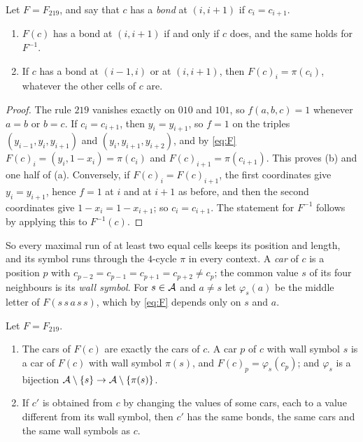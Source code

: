\begin{lemma}\label{hw:bonds}
Let $F=F_{219}$, and say that $c$ has a \emph{bond} at $(i,i+1)$ if $c_i=c_{i+1}$.
\begin{enumerate}
\item[(a)] $F(c)$ has a bond at $(i,i+1)$ if and only if $c$ does, and the same holds for $F^{-1}$.
\item[(b)] If $c$ has a bond at $(i-1,i)$ or at $(i,i+1)$, then $F(c)_i=\pi(c_i)$, whatever the other cells of $c$ are.
\end{enumerate}
\end{lemma}

\begin{proof}
The rule $219$ vanishes exactly on $010$ and $101$, so $f(a,b,c)=1$ whenever $a=b$ or $b=c$. If $c_i=c_{i+1}$, then $y_i=y_{i+1}$, so $f=1$ on the triples $(y_{i-1},y_i,y_{i+1})$ and $(y_i,y_{i+1},y_{i+2})$, and by \eqref{eq:F} $F(c)_i=(y_i,1-x_i)=\pi(c_i)$ and $F(c)_{i+1}=\pi(c_{i+1})$. This proves (b) and one half of (a). Conversely, if $F(c)_i=F(c)_{i+1}$, the first coordinates give $y_i=y_{i+1}$, hence $f=1$ at $i$ and at $i+1$ as before, and then the second coordinates give $1-x_i=1-x_{i+1}$; so $c_i=c_{i+1}$. The statement for $F^{-1}$ follows by applying this to $F^{-1}(c)$.
\end{proof}

So every maximal run of at least two equal cells keeps its position and length, and its symbol runs through the $4$-cycle $\pi$ in every context. A \emph{car} of $c$ is a position $p$ with $c_{p-2}=c_{p-1}=c_{p+1}=c_{p+2}\ne c_p$; the common value $s$ of its four neighbours is its \emph{wall symbol}. For $s\in\mathcal{A}$ and $a\ne s$ let $\varphi_s(a)$ be the middle letter of $F(s\,s\,a\,s\,s)$, which by \eqref{eq:F} depends only on $s$ and $a$.

\begin{lemma}\label{hw:cars219}
Let $F=F_{219}$.
\begin{enumerate}
\item[(a)] The cars of $F(c)$ are exactly the cars of $c$. A car $p$ of $c$ with wall symbol $s$ is a car of $F(c)$ with wall symbol $\pi(s)$, and $F(c)_p=\varphi_s(c_p)$; and $\varphi_s$ is a bijection $\mathcal{A}\setminus\{s\}\to\mathcal{A}\setminus\{\pi(s)\}$.
\item[(b)] If $c'$ is obtained from $c$ by changing the values of some cars, each to a value different from its wall symbol, then $c'$ has the same bonds, the same cars and the same wall symbols as $c$.
\end{enumerate}
\end{lemma}

